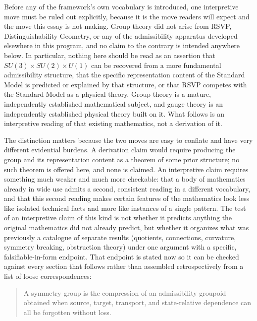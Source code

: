 \documentclass[11pt]{article}
\begin{document}
Before any of the framework's own vocabulary is introduced, one interpretive move must be ruled out explicitly, because it is the move readers will expect and the move this essay is not making. Group theory did not arise from RSVP, Distinguishability Geometry, or any of the admissibility apparatus developed elsewhere in this program, and no claim to the contrary is intended anywhere below. In particular, nothing here should be read as an assertion that $SU(3)\times SU(2)\times U(1)$ can be recovered from a more fundamental admissibility structure, that the specific representation content of the Standard Model is predicted or explained by that structure, or that RSVP competes with the Standard Model as a physical theory. Group theory is a mature, independently established mathematical subject, and gauge theory is an independently established physical theory built on it. What follows is an interpretive reading of that existing mathematics, not a derivation of it.

The distinction matters because the two moves are easy to conflate and have very different evidential burdens. A derivation claim would require producing the group and its representation content as a theorem of some prior structure; no such theorem is offered here, and none is claimed. An interpretive claim requires something much weaker and much more checkable: that a body of mathematics already in wide use admits a second, consistent reading in a different vocabulary, and that this second reading makes certain features of the mathematics look less like isolated technical facts and more like instances of a single pattern. The test of an interpretive claim of this kind is not whether it predicts anything the original mathematics did not already predict, but whether it organizes what was previously a catalogue of separate results (quotients, connections, curvature, symmetry breaking, obstruction theory) under one argument with a specific, falsifiable-in-form endpoint. That endpoint is stated now so it can be checked against every section that follows rather than assembled retrospectively from a list of loose correspondences:

\begin{quote}
A symmetry group is the compression of an admissibility groupoid obtained when source, target, transport, and state-relative dependence can all be forgotten without loss.
\end{quote}
\end{document}
